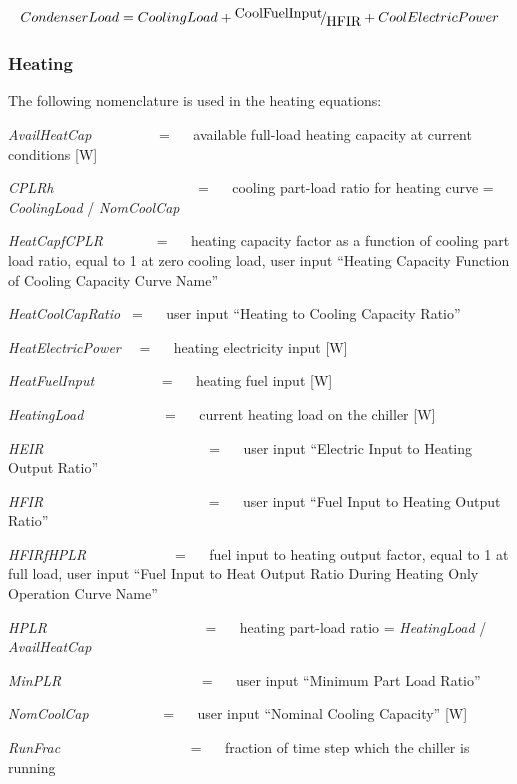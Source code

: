 \begin{equation}
CondenserLoad = CoolingLoad + {\raise0.7ex\hbox{{CoolFuelInput}} \!\mathord{\left/ {\vphantom {{CoolFuelInput} {HFIR}}}\right.}\!\lower0.7ex\hbox{{HFIR}}} + CoolElectricPower
\end{equation}

\subsubsection{Heating}\label{heating}

The following nomenclature is used in the heating equations:

\emph{AvailHeatCap}~~~~~~~~~ = ~~ available full-load heating capacity at current conditions {[}W{]}

\emph{CPLRh}~~~~~~~~~~~~~~~~~~~~ = ~~ cooling part-load ratio for heating curve = \emph{CoolingLoad} / \emph{NomCoolCap}

\emph{HeatCapfCPLR}~~~~~~~ = ~~ heating capacity factor as a function of cooling part load ratio, equal to 1 at zero cooling load, user input ``Heating Capacity Function of Cooling Capacity Curve Name''

\emph{HeatCoolCapRatio~} = ~~ user input ``Heating to Cooling Capacity Ratio''

\emph{HeatElectricPower}~~ = ~~ heating electricity input {[}W{]}

\emph{HeatFuelInput}~~~~~~~~~ = ~~ heating fuel input {[}W{]}

\emph{HeatingLoad}~~~~~~~~~~~ = ~~ current heating load on the chiller {[}W{]}

\emph{HEIR}~~~~~~~~~~~~~~~~~~~~~~~ = ~~ user input ``Electric Input to Heating Output Ratio''

\emph{HFIR}~~~~~~~~~~~~~~~~~~~~~~~ = ~~ user input ``Fuel Input to Heating Output Ratio''

\emph{HFIRfHPLR}~~~~~~~~~~~~ = ~~ fuel input to heating output factor, equal to 1 at full load, user input ``Fuel Input to Heat Output Ratio During Heating Only Operation Curve Name''

\emph{HPLR}~~~~~~~~~~~~~~~~~~~~~~ = ~~ heating part-load ratio = \emph{HeatingLoad} / \emph{AvailHeatCap}

\emph{MinPLR~~~~~~~~~~~~~~~~~~~} = ~~ user input ``Minimum Part Load Ratio''

\emph{NomCoolCap}~~~~~~~~~~ = ~~ user input ``Nominal Cooling Capacity'' {[}W{]}

\emph{RunFrac}~~~~~~~~~~~~~~~~~~ = ~~ fraction of time step which the chiller is running


